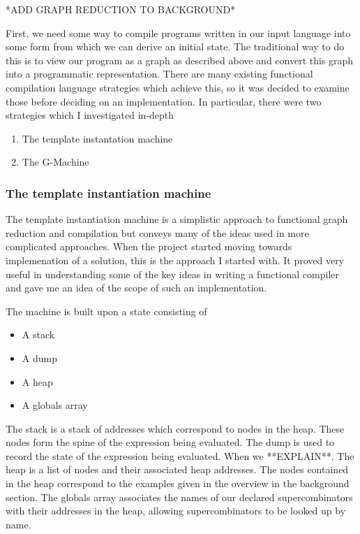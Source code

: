 *ADD GRAPH REDUCTION TO BACKGROUND*

First, we need some way to compile programs written in our input language into
some form from which we can derive an initial state. The traditional way to
do this is to view our program as a graph as described above and convert this
graph into a programmatic representation. There are many existing functional
compilation language strategies which achieve this, so it was decided to 
examine those before deciding on an implementation. In particular, there were
two strategies which I investigated in-depth

\begin{enumerate}
	\item The template instantation machine
	\item The G-Machine
\end{enumerate}

\subsubsection{The template instantiation machine} 
The template instantiation machine is a simplistic approach to
functional graph reduction and compilation but conveys many of 
the ideas used in more complicated approaches. When the project
started moving towards implemenation of a solution, this is the
approach I started with. It proved very useful in understanding
some of the key ideas in writing a functional compiler and gave
me an idea of the scope of such an implementation. 

The machine is built upon a state consisting of
\begin{itemize}
	\item A stack
	\item A dump
	\item A heap
	\item A globals array
\end{itemize}

\noindent The stack is a stack of addresses which correspond
to nodes in the heap. These nodes form the spine of the 
expression being evaluated. The dump is used to record the
state of the expression being evaluated. When we **EXPLAIN**.
The heap is a list of nodes and their associated heap addresses.
The nodes contained in the heap correspond to the examples
given in the overview in the background section.
The globals array associates the names of our declared
supercombinators with their addresses in the heap, allowing
supercombinators to be looked up by name. 

